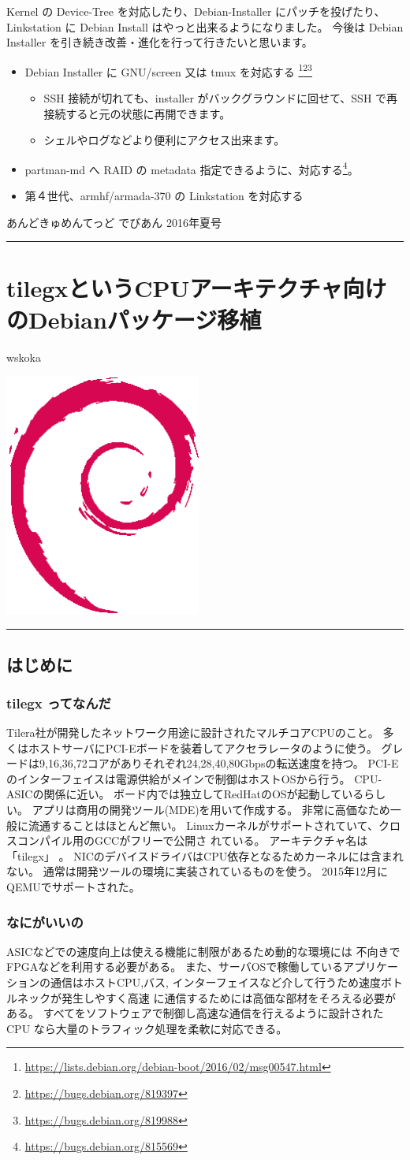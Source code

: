 \documentclass[mingoth,a4paper]{jsarticle}
\renewcommand{\dancersection}[2]{%
\newpage
あんどきゅめんてっど でびあん 2016年夏号
%
\vspace{0.1mm}\\
{\color{dancerdarkblue}\rule{\hsize}{2mm}}

%
%
\begin{minipage}[t]{0.6\hsize}
\color{dancerdarkblue}
\vspace{1cm}
\section{#1}
\hfill{}#2\\
\end{minipage}
\begin{minipage}[t]{0.4\hsize}
\vspace{-2cm}
\hfill{}\includegraphics[height=8cm]{image200502/openlogo-nd.eps}\\
\vspace{-5cm}
\end{minipage}
%
{\color{dancerlightblue}\rule{0.66\hsize}{2mm}}
%
\vspace{2cm}
}
\begin{document}
Kernel の Device-Tree を対応したり、Debian-Installer にパッチを投げたり、Linkstation に Debian Install はやっと出来るようになりました。
今後は Debian Installer を引き続き改善・進化を行って行きたいと思います。
\begin{itemize}
\item Debian Installer に GNU/screen 又は tmux を対応する
\footnote{\url{https://lists.debian.org/debian-boot/2016/02/msg00547.html}}\footnote{\url{https://bugs.debian.org/819397}}\footnote{\url{https://bugs.debian.org/819988}}
	\begin{itemize}
	\item SSH 接続が切れても、installer がバックグラウンドに回せて、SSH で再接続すると元の状態に再開できます。
	\item シェルやログなどより便利にアクセス出来ます。
	\end{itemize}
\item partman-md へ RAID の metadata 指定できるように、対応する\footnote{\url{https://bugs.debian.org/815569}}。
\item 第４世代、armhf/armada-370 の Linkstation を対応する
\end{itemize}

\dancersection{tilegxというCPUアーキテクチャ向けのDebianパッケージ移植}{wskoka}

\subsection{はじめに}

\subsubsection{tilegx ってなんだ}
Tilera社が開発したネットワーク用途に設計されたマルチコアCPUのこと。
多くはホストサーバにPCI-Eボードを装着してアクセラレータのように使う。
グレードは9,16,36,72コアがありそれぞれ24,28,40,80Gbpsの転送速度を持つ。
PCI-Eのインターフェイスは電源供給がメインで制御はホストOSから行う。
CPU-ASICの関係に近い。
ボード内では独立してRedHatのOSが起動しているらしい。
アプリは商用の開発ツール(MDE)を用いて作成する。
非常に高価なため一般に流通することはほとんど無い。
Linuxカーネルがサポートされていて、クロスコンパイル用のGCCがフリーで公開さ
れている。
アーキテクチャ名は「tilegx」 。
NICのデバイスドライバはCPU依存となるためカーネルには含まれない。
通常は開発ツールの環境に実装されているものを使う。
2015年12月にQEMUでサポートされた。 

\subsubsection{なにがいいの}
ASICなどでの速度向上は使える機能に制限があるため動的な環境には
不向きでFPGAなどを利用する必要がある。
また、サーバOSで稼働しているアプリケーションの通信はホストCPU,バス,
インターフェイスなど介して行うため速度ボトルネックが発生しやすく高速
に通信するためには高価な部材をそろえる必要がある。
すべてをソフトウェアで制御し高速な通信を行えるように設計されたCPU
なら大量のトラフィック処理を柔軟に対応できる。 
\end{document}
